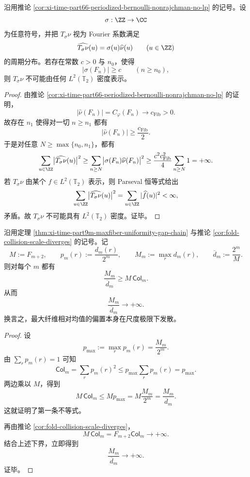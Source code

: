 \begin{theorem}\label{thm:xi-time-part66-fibonacci-visible-multiplier-no-l2}
沿用推论 \ref{cor:xi-time-part66-periodized-bernoulli-nonrajchman-no-lp} 的记号。设
\[
\sigma:\ZZ\to \CC
\]
为任意符号，并把 \(T_\sigma\nu\) 视为 Fourier 系数满足
\[
\widehat{T_\sigma\nu}(u)=\sigma(u)\widehat\nu(u)
\qquad (u\in\ZZ)
\]
的周期分布。若存在常数 \(c>0\) 与 \(n_0\)，使得
\[
|\sigma(F_n)|\ge c
\qquad (n\ge n_0),
\]
则 \(T_\sigma\nu\) 不可能由任何 \(L^2(\mathbb T_2)\) 密度表示。
\end{theorem}
\begin{proof}
由推论 \ref{cor:xi-time-part66-periodized-bernoulli-nonrajchman-no-lp} 的证明，
\[
|\widehat\nu(F_n)|=C_\varphi(F_n)\longrightarrow c_{\mathrm{Fib}}>0.
\]
故存在 \(n_1\) 使得对一切 \(n\ge n_1\) 都有
\[
|\widehat\nu(F_n)|\ge \frac{c_{\mathrm{Fib}}}{2}.
\]
于是对任意 \(N\ge \max\{n_0,n_1\}\)，都有
\[
\sum_{u\in\ZZ}\bigl|\widehat{T_\sigma\nu}(u)\bigr|^2
\ge
\sum_{n\ge N}\bigl|\sigma(F_n)\widehat\nu(F_n)\bigr|^2
\ge
\frac{c^2c_{\mathrm{Fib}}^2}{4}\sum_{n\ge N}1
=+\infty.
\]
若 \(T_\sigma\nu\) 由某个 \(f\in L^2(\mathbb T_2)\) 表示，则 Parseval 恒等式给出
\[
\sum_{u\in\ZZ}\bigl|\widehat{T_\sigma\nu}(u)\bigr|^2
=
\sum_{u\in\ZZ}|\widehat f(u)|^2
<
\infty,
\]
矛盾。故 \(T_\sigma\nu\) 不可能具有 \(L^2(\mathbb T_2)\) 密度。证毕。
\end{proof}

\begin{theorem}[最大纤维相对均值的放大因子无界]\label{thm:xi-time-part66-maxfiber-over-mean-diverges}
沿用定理 \ref{thm:xi-time-part9m-maxfiber-uniformity-gap-chain} 与推论
\ref{cor:fold-collision-scale-diverges} 的记号。记
\[
M:=F_{m+2},
\qquad
p_m(r):=\frac{d_m(r)}{2^m},
\qquad
M_m:=\max_r d_m(r),
\qquad
\overline d_m:=\frac{2^m}{M}.
\]
则对每个 \(m\) 都有
\[
\boxed{\;
\frac{M_m}{\overline d_m}\ge M\,\mathsf{Col}_m.\;}
\]
从而
\[
\boxed{\;
\frac{M_m}{\overline d_m}\longrightarrow +\infty.\;}
\]
换言之，最大纤维相对均值的偏置本身在尺度极限下发散。
\end{theorem}
\begin{proof}
设
\[
p_{\max}:=\max_r p_m(r)=\frac{M_m}{2^m}.
\]
由 \(\sum_r p_m(r)=1\) 可知
\[
\mathsf{Col}_m=\sum_r p_m(r)^2\le p_{\max}\sum_r p_m(r)=p_{\max}.
\]
两边乘以 \(M\)，得到
\[
M\,\mathsf{Col}_m\le M p_{\max}=M\frac{M_m}{2^m}=\frac{M_m}{\overline d_m}.
\]
这就证明了第一条不等式。

再由推论 \ref{cor:fold-collision-scale-diverges}，
\[
M\,\mathsf{Col}_m=F_{m+2}\mathsf{Col}_m\longrightarrow +\infty.
\]
结合上述下界，立即得到
\[
\frac{M_m}{\overline d_m}\longrightarrow +\infty.
\]
证毕。
\end{proof}

